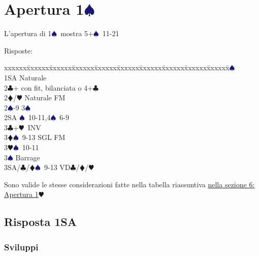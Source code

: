 \documentclass[a4paper,italian]{article}
\newcommand{\BC}{\textcolor{OliveGreen}{$\clubsuit$}}
\newcommand{\BD}{\textcolor{RedOrange}{$\vardiamondsuit$}}
\newcommand{\BH}{\textcolor{Red2}{$\varheartsuit${}}}
\newcommand{\BS}{\textcolor{MidnightBlue}{$\spadesuit${}}}
\newcommand{\pdfs}{\texorpdfstring{\BS{}}{S}}
\newenvironment{bidtable}
{\begin{tabbing}

    xxxxxx\=xxxxxx\=xxxxxx\=xxxxxx\=xxxxxx\=xxxxxx\=xxxxxx\=xxxxxx\=xxxxxx\=xxxxxx\=\kill}
{\end{tabbing} }%
\begin{document}
                                    \section{Apertura 1\pdfs}
                                    \begin{multicols}{2}
                                        L'apertura di 1\BS\ mostra 5+\BS\ 11-21

                                        Risposte:
                                        \begin{bidtable}
                                            1\BS\+\\
                                            1SA \>\> Naturale\\
                                            2\BC \>+ con fit, bilanciata o 4+\BC \\
                                            2\BD/\BH \>\> Naturale FM\\
                                            2\BS \>-9 3\BS \\
                                            2SA \>\BS\ 10-11,4\BS\ 6-9\\
                                            3\BC \>+\BH\ INV\\
                                            3\BD \>\BS\ 9-13 SGL FM\\
                                            3\BH \>\BS\ 10-11\\
                                            3\BS \>\> Barrage\\
                                            3SA/\BC/\BD \>\BS\ 9-13 VD\BC /\BD /\BH \-
                                        \end{bidtable}

                                        Sono valide le stesse considerazioni fatte nella tabella riassuntiva \hyperref[1Maggiore]{nella sezione 6: Apertura 1\BH}
                                        \subsection{Risposta 1SA}

                                        \subsubsection{Sviluppi}


\end{multicols}
\end{document}
